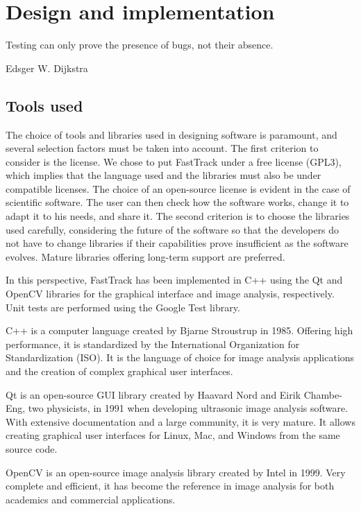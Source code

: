 \chapter{Design and implementation}

    \epigraph{Testing can only prove the presence of bugs, not their absence.}{Edsger W. Dijkstra}

    \section{Tools used}
    The choice of tools and libraries used in designing software is paramount, and several selection factors must be taken into account.
    The first criterion to consider is the license. We chose to put FastTrack under a free license (GPL3), which implies that the language used and the libraries must also be under compatible licenses. The choice of an open-source license is evident in the case of scientific software. The user can then check how the software works, change it to adapt it to his needs, and share it.
    The second criterion is to choose the libraries used carefully, considering the future of the software so that the developers do not have to change libraries if their capabilities prove insufficient as the software evolves. Mature libraries offering long-term support are preferred.

    In this perspective, FastTrack has been implemented in C++ using the Qt \cite{Qt} and OpenCV \cite{opencv_library} libraries for the graphical interface and image analysis, respectively. Unit tests are performed using the Google Test library.

    C++ is a computer language created by Bjarne Stroustrup in 1985. Offering high performance, it is standardized by the International Organization for Standardization (ISO). It is the language of choice for image analysis applications and the creation of complex graphical user interfaces.

    Qt is an open-source GUI library created by Haavard Nord and Eirik Chambe-Eng, two physicists, in 1991 when developing ultrasonic image analysis software. With extensive documentation and a large community, it is very mature. It allows creating graphical user interfaces for Linux, Mac, and Windows from the same source code.

    OpenCV is an open-source image analysis library created by Intel in 1999. Very complete and efficient, it has become the reference in image analysis for both academics and commercial applications.

